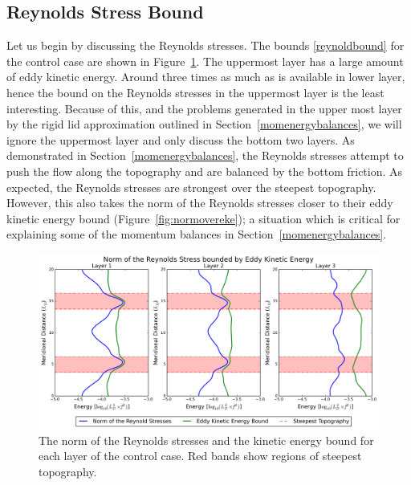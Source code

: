 \documentclass[12pt,a4paper]{report}
\newcommand*\figref[1]{Figure~\ref{#1}}
\newcommand*\secref[1]{Section~\ref{#1}}
\begin{document}
\subsection{Reynolds Stress Bound}

Let us begin by discussing the Reynolds stresses. 
The bounds \eqref{reynoldbound} for the control case
are shown in \figref{fig:ekebound}.
The uppermost layer has a large amount of eddy kinetic energy. Around three
times as much as is available in lower layer, hence the bound on the Reynolds stresses in
the uppermost layer is the least interesting. 
Because of this, and the problems generated in the
upper most layer by the rigid lid approximation outlined in \secref{momenergybalances}, 
we will ignore the uppermost layer and only discuss the bottom two layers. 
As demonstrated in \secref{momenergybalances}, the Reynolds stresses attempt to 
push the flow along the topography and are balanced by the bottom friction.
As expected, the Reynolds stresses are strongest over the steepest topography.
However, this also takes the norm of the Reynolds stresses closer to their
eddy kinetic energy bound (\figref{fig:normovereke}); a situation which is critical for explaining some of the 
momentum balances in \secref{momenergybalances}.


\begin{figure}
	\centering
	\includegraphics[width=\linewidth]{ekebound}
	\caption{ The norm of the Reynolds stresses and the kinetic energy bound for
		each layer of the control case.  Red bands show regions of steepest topography.}
	\label{fig:ekebound}
\end{figure}
\end{document}
